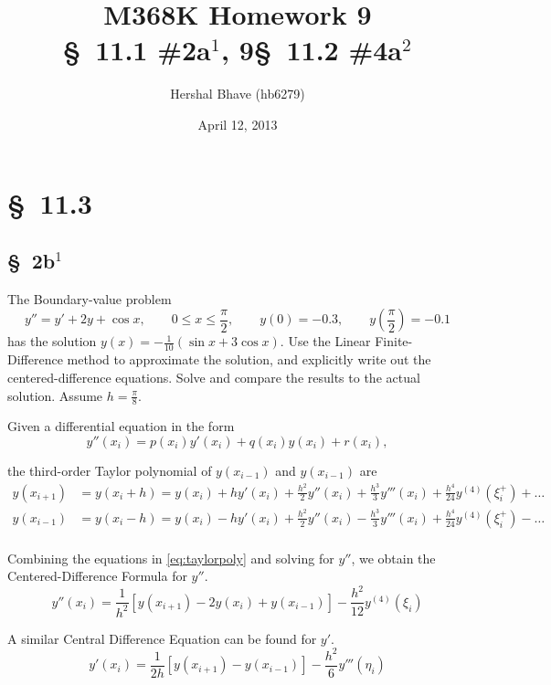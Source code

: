 \documentclass[12pt]{article}
\title{M368K Homework 9 \\
  \normalsize{\S~11.1 \#2a$^1$, 9\quad \S~11.2 \#4a$^2$}}
\author{Hershal Bhave (hb6279)}
\date{April 12, 2013}
\begin{document}
\maketitle

\section{\S~11.3}
\subsection{\S~2b$^1$}

The Boundary-value problem 
$$ y'' = y'+2y+\cos x, \qquad 0\leq x\leq\frac{\pi}{2},\qquad y(0)=-0.3,\qquad y\left(\frac{\pi}{2}\right)=-0.1 $$
has the solution $y(x) = -\frac{1}{10}(\sin x + 3\cos x)$. Use the
Linear Finite-Difference method to approximate the solution, and
explicitly write out the centered-difference equations. Solve and
compare the results to the actual solution. Assume $h=\frac{\pi}{8}$.

Given a differential equation in the form
\begin{equation}
  \label{eq:gendiff}
  y''(x_i)=p(x_i)y'(x_i)+q(x_i)y(x_i)+r(x_i),
\end{equation}

the third-order Taylor polynomial of $y(x_{i-1})$ and $y(x_{i-1})$ are
\begin{equation}
  \label{eq:taylorpoly}
  \begin{aligned}
    y(x_{i+1}) &= y(x_i+h) = y(x_i) + hy'(x_i)+\frac{h^2}{2}y''(x_i) + \frac{h^3}{3}y'''(x_i)+\frac{h^4}{24}y^{(4)}(\xi_i^+)+\ldots\\
    y(x_{i-1}) &= y(x_i-h) = y(x_i) - hy'(x_i)+\frac{h^2}{2}y''(x_i)
    - \frac{h^3}{3}y'''(x_i)+\frac{h^4}{24}y^{(4)}(\xi_i^+)-\ldots \\
  \end{aligned}
\end{equation}

Combining the equations in \cref{eq:taylorpoly} and solving for $y''$, we obtain the
Centered-Difference Formula for $y''$.
\begin{equation}
  \label{eq:centdiffypp}
  y''(x_i)=\frac{1}{h^2}[y(x_{i+1})-2y(x_i)+y(x_{i-1})]-\frac{h^2}{12}y^{(4)}(\xi_i) 
\end{equation}

A similar Central Difference Equation can be found for $y'$.
\begin{equation}
  \label{eq:centdiffyp}
  y'(x_i)=\frac{1}{2h}[y(x_{i+1})-y(x_{i-1})]-\frac{h^2}{6}y'''(\eta_i)
\end{equation}
\end{document}
